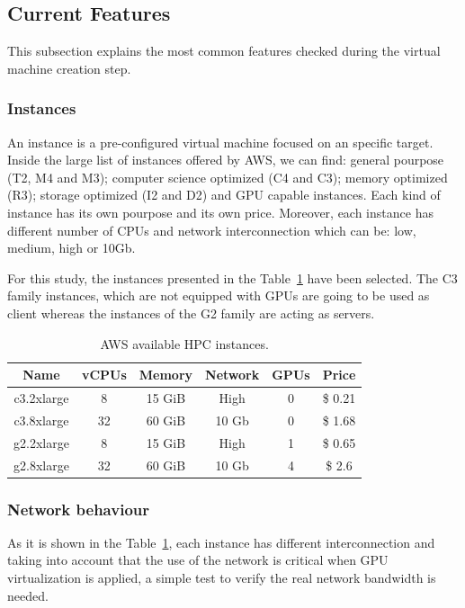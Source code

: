 \documentclass[a4paper,twoside]{article}
\begin{document}
\subsection{Current Features}
This subsection explains the most common features checked during 
the virtual machine creation step.

\subsubsection{Instances}

An instance is a pre-configured virtual machine focused on an 
specific target. Inside the large list of instances offered by AWS, 
we can find: general pourpose (T2, M4 and M3); computer science optimized 
(C4 and C3); memory optimized (R3); storage optimized (I2 and D2) and 
GPU capable instances. Each kind of instance has its own pourpose and its 
own price. Moreover, each instance has different number of CPUs and network 
interconnection which can be: low, medium, high or 10Gb.

For this study, the instances presented in the Table~\ref{table:awsInstances} 
have been selected. The C3 family instances, which are not equipped with 
GPUs are going to be used as client whereas the instances of the G2 family are 
acting as servers.   

\begin{table}[htb]
\renewcommand{\arraystretch}{1.3}
\caption{AWS available HPC instances.}
\label{table:awsInstances}
\tabcolsep=0.09cm
\begin{center}\begin{tabular}{cccccc}
Name & vCPUs & Memory & Network & GPUs & Price\\ \hline \hline
c3.2xlarge & 8 & 15 GiB & High & 0 & \$ 0.21\\ \hline
c3.8xlarge & 32 & 60 GiB & 10 Gb & 0 & \$ 1.68 \\ \hline
g2.2xlarge & 8 & 15 GiB & High & 1 & \$ 0.65\\ \hline
g2.8xlarge & 32 & 60 GiB & 10 Gb & 4 & \$ 2.6 \\ \hline
\end{tabular}\end{center}\end{table}

\subsubsection{Network behaviour}
As it is shown in the Table~\ref{table:awsInstances}, each instance has different 
interconnection and taking into account that the use of the network 
is critical when GPU virtualization is applied, a simple test to verify the 
real network bandwidth is needed.
\end{document}
